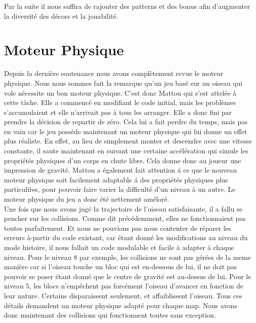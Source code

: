 \documentclass [11pt]{report}
\begin{document}
			Par la suite il nous suffira de rajouter des patterns et des bonus afin d'augmenter la diversité des décors et la jouabilité.
			
			\vspace{10mm}
			
\newpage
	\section{Moteur Physique}
		Depuis la dernière soutenance nous avons complètement revue le moteur physique. Nous nous sommes fait la remarque qu'un jeu bas\'e sur un oiseau qui vole nécessite un bon moteur physique. C'est donc Mattou qui s'est attelée \`a cette t\^ache. Elle a commencé en modifiant le code initial, mais les problèmes s'accumulaient et elle n'arrivait pas \`a tous les arranger. Elle a donc fini par prendre la décision de repartir de zéro. Cela lui a fait perdre du temps, mais pas en vain car le jeu possède maintenant un moteur physique qui lui donne un effet plus r\'ealiste. En effet, au lieu de simplement monter et descendre avec une vitesse constante, il saute maintenant en suivant une certaine accélération qui simule les propri\'et\'es physiques d'un corps en chute libre. Cela donne donc au joueur une impression de gravit\'e. Mattou a \'egalement fait attention \'a ce que le nouveau moteur physique soit facilement adaptable \'a des propri\'et\'es physiques plus particuli\`res, pour pouvoir faire varier la difficult\'e d'un niveau \`a un autre. Le moteur physique du jeu a donc \'et\'e nettement am\'elor\'e. \\
		
		\indent Une fois que nous avons jugé la trajectoire de l'oiseau satisfaisante, il a fallu se pencher sur les collisions. Comme dit précédemment, elles ne fonctionnaient pas toutes parfaitement. Et nous ne pouvions pas nous contenter de réparer les erreurs à-partir du code existant, car étant donné les modifications au niveau du mode histoire, il nous fallait un code modulable et facile à adapter à chaque niveau. Pour le niveau 8 par exemple, les collisions ne sont pas gérées de la meme manière car si l'oiseau touche un bloc qui est en-dessous de lui, il ne doit pas pouvoir se poser étant donné que le centre de gravité est au-dessus de lui. Pour le niveau 5, les blocs n'empêchent pas forcément l'oiseau d'avancer en fonction de leur nature. Certains disparaissent seulement, et affaiblissent l'oiseau. Tous ces détails demandent un moteur physique adapté pour chaque map. Nous avons donc maintenant des collisions qui fonctionnent toutes sans exception.
		
\end{document}
